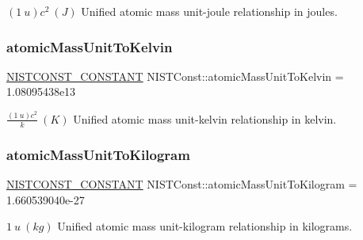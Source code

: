$(1\ u)c^2 \ (J)$ Unified atomic mass unit-\/joule relationship in joules. \mbox{\label{group___n_i_s_t_const-_atomic_mass_unit_ga74d5a7e0d6f6182731b839a578353769}} 
\subsubsection{\texorpdfstring{atomic\+Mass\+Unit\+To\+Kelvin}{atomicMassUnitToKelvin}}
{\footnotesize\ttfamily \mbox{\hyperlink{_n_i_s_t_const_8hpp_a2b0fc1d7452373f816175dd86ce26729}{N\+I\+S\+T\+C\+O\+N\+S\+T\+\_\+\+C\+O\+N\+S\+T\+A\+NT}} N\+I\+S\+T\+Const\+::atomic\+Mass\+Unit\+To\+Kelvin = 1.\+08095438e13}

$\frac{(1\ u)c^2}{k} \ (K)$ Unified atomic mass unit-\/kelvin relationship in kelvin. \mbox{\label{group___n_i_s_t_const-_atomic_mass_unit_ga72ba2b08855b26ea2477c3e8104bbc16}} 
\subsubsection{\texorpdfstring{atomic\+Mass\+Unit\+To\+Kilogram}{atomicMassUnitToKilogram}}
{\footnotesize\ttfamily \mbox{\hyperlink{_n_i_s_t_const_8hpp_a2b0fc1d7452373f816175dd86ce26729}{N\+I\+S\+T\+C\+O\+N\+S\+T\+\_\+\+C\+O\+N\+S\+T\+A\+NT}} N\+I\+S\+T\+Const\+::atomic\+Mass\+Unit\+To\+Kilogram = 1.\+660539040e-\/27}

$1\ u\ (kg)$ Unified atomic mass unit-\/kilogram relationship in kilograms. 